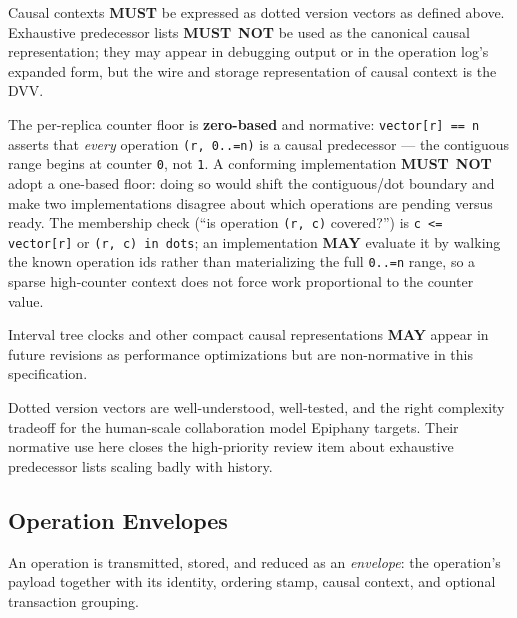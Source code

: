 \documentclass[11pt,letterpaper]{report}
\newcounter{requirement}[chapter]
\newcommand{\MUST}{\textbf{MUST}}
\newcommand{\MUSTNOT}{\textbf{MUST}\nobreak\ \textbf{NOT}}
\newcommand{\MAY}{\textbf{MAY}}
\begin{document}
\begin{requirement}
  \label{req:semops:dotted-version-vectors}
  Causal contexts \MUST{} be expressed as dotted version vectors as
  defined above. Exhaustive predecessor lists \MUSTNOT{} be used as
  the canonical causal representation; they may appear in debugging
  output or in the operation log's expanded form, but the wire and
  storage representation of causal context is the DVV.

  The per-replica counter floor is \textbf{zero-based} and
  normative: \texttt{vector[r] == n} asserts that \emph{every}
  operation \texttt{(r,\,0..=n)} is a causal predecessor --- the
  contiguous range begins at counter \texttt{0}, not \texttt{1}. A
  conforming implementation \MUSTNOT{} adopt a one-based floor: doing
  so would shift the contiguous/dot boundary and make two
  implementations disagree about which operations are pending versus
  ready. The membership check (``is operation \texttt{(r,\,c)}
  covered?'') is \texttt{c <= vector[r]} or \texttt{(r,\,c) in dots};
  an implementation \MAY{} evaluate it by walking the known operation
  ids rather than materializing the full \texttt{0..=n} range, so a
  sparse high-counter context does not force work proportional to the
  counter value.

  Interval tree clocks and other compact causal representations
  \MAY{} appear in future revisions as performance optimizations but
  are non-normative in this specification.
\end{requirement}

\begin{rationale}
  Dotted version vectors are well-understood, well-tested, and the
  right complexity tradeoff for the human-scale collaboration model
  Epiphany targets. Their normative use here closes the high-priority
  review item about exhaustive predecessor lists scaling badly with
  history.
\end{rationale}

\subsection{Operation Envelopes}

An operation is transmitted, stored, and reduced as an
\emph{envelope}: the operation's payload together with its identity,
ordering stamp, causal context, and optional transaction grouping.
\end{document}
